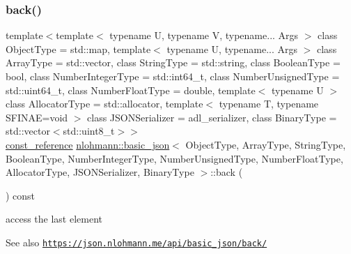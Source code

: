 \subsubsection{\texorpdfstring{back()}{back()}\hspace{0.1cm}{\footnotesize\ttfamily [2/2]}}
{\footnotesize\ttfamily template$<$template$<$ typename U, typename V, typename... Args $>$ class Object\+Type = std\+::map, template$<$ typename U, typename... Args $>$ class Array\+Type = std\+::vector, class String\+Type  = std\+::string, class Boolean\+Type  = bool, class Number\+Integer\+Type  = std\+::int64\+\_\+t, class Number\+Unsigned\+Type  = std\+::uint64\+\_\+t, class Number\+Float\+Type  = double, template$<$ typename U $>$ class Allocator\+Type = std\+::allocator, template$<$ typename T, typename S\+F\+I\+N\+A\+E=void $>$ class J\+S\+O\+N\+Serializer = adl\+\_\+serializer, class Binary\+Type  = std\+::vector$<$std\+::uint8\+\_\+t$>$$>$ \\
\hyperlink{classnlohmann_1_1basic__json_ab8a1c33ee7b154fc41ca2545aa9724e6}{const\+\_\+reference} \hyperlink{classnlohmann_1_1basic__json}{nlohmann\+::basic\+\_\+json}$<$ Object\+Type, Array\+Type, String\+Type, Boolean\+Type, Number\+Integer\+Type, Number\+Unsigned\+Type, Number\+Float\+Type, Allocator\+Type, J\+S\+O\+N\+Serializer, Binary\+Type $>$\+::back (\begin{DoxyParamCaption}{ }\end{DoxyParamCaption}) const\hspace{0.3cm}{\ttfamily [inline]}}



access the last element 

\begin{DoxySeeAlso}{See also}
\href{https://json.nlohmann.me/api/basic_json/back/}{\tt https\+://json.\+nlohmann.\+me/api/basic\+\_\+json/back/} 
\end{DoxySeeAlso}
\mbox{\label{classnlohmann_1_1basic__json_a23b495b4c282e4afacf382f5b49af7c7}} 
